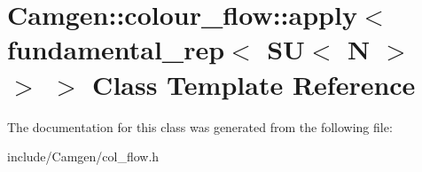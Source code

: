 \hypertarget{a00016}{}\section{Camgen\+:\+:colour\+\_\+flow\+:\+:apply$<$ fundamental\+\_\+rep$<$ S\+U$<$ N $>$ $>$ $>$ Class Template Reference}
\label{a00016}


The documentation for this class was generated from the following file\+:\begin{DoxyCompactItemize}
\item 
include/\+Camgen/col\+\_\+flow.\+h\end{DoxyCompactItemize}
